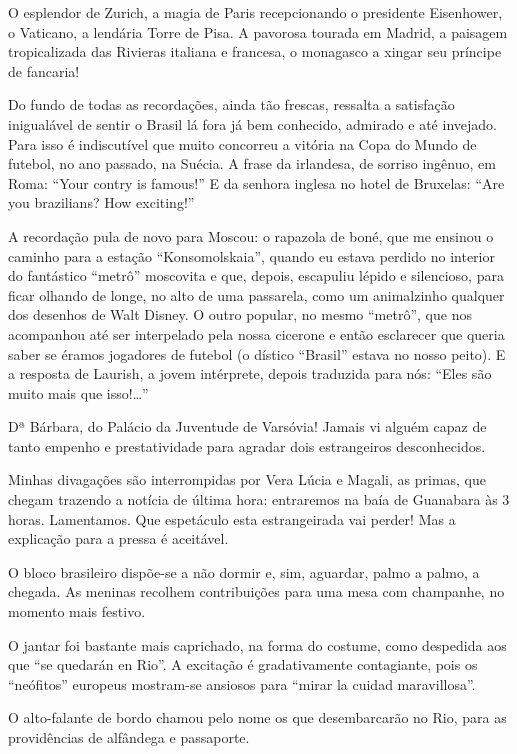 O esplendor de Zurich, a magia de Paris recepcionando o presidente Eisenhower, o Vaticano, a lendária Torre de Pisa. A pavorosa tourada em Madrid, a paisagem tropicalizada das Rivieras italiana e francesa, o monagasco a xingar seu príncipe de fancaria!

Do fundo de todas as recordações, ainda tão frescas, ressalta a satisfação inigualável de sentir o Brasil lá fora já bem conhecido, admirado e até invejado. Para isso é indiscutível que muito concorreu a vitória na Copa do Mundo de futebol, no ano passado, na Suécia. A frase da irlandesa, de sorriso ingênuo, em Roma: ``Your contry is famous!'' E da senhora inglesa no hotel de Bruxelas: ``Are you brazilians? How exciting!''

A recordação pula de novo para Moscou: o rapazola de boné, que me ensinou o caminho para a estação ``Konsomolskaia'', quando eu estava perdido no interior do fantástico ``metrô'' moscovita e que, depois, escapuliu lépido e silencioso, para ficar olhando de longe, no alto de uma passarela, como um animalzinho qualquer dos desenhos de Walt Disney. O outro popular, no mesmo ``metrô'', que nos acompanhou até ser interpelado pela nossa cicerone e então esclarecer que queria saber se éramos jogadores de futebol (o dístico ``Brasil'' estava no nosso peito). E a resposta de Laurish, a jovem intérprete, depois traduzida para nós: ``Eles são muito mais que isso!\ldots''

Dª Bárbara, do Palácio da Juventude de Varsóvia! Jamais vi alguém capaz de tanto empenho e prestatividade para agradar dois estrangeiros desconhecidos.

Minhas divagações são interrompidas por Vera Lúcia e Magali, as primas, que chegam trazendo a notícia de última hora: entraremos na baía de Guanabara às 3 horas. Lamentamos. Que espetáculo esta estrangeirada vai perder! Mas a explicação para a pressa é aceitável.

O bloco brasileiro dispõe-se a não dormir e, sim, aguardar, palmo a palmo, a chegada. As meninas recolhem contribuições para uma mesa com champanhe, no momento mais festivo.

O jantar foi bastante mais caprichado, na forma do costume, como despedida aos que ``se quedarán en Rio''. A excitação é gradativamente contagiante, pois os ``neófitos'' europeus mostram-se ansiosos para ``mirar la cuidad maravillosa''.

O alto-falante de bordo chamou pelo nome os que desembarcarão no Rio, para as providências de alfândega e passaporte.

